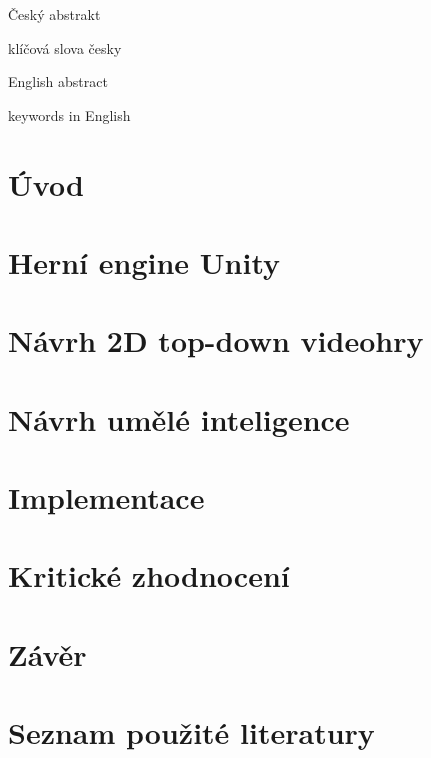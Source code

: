\documentclass[FM,Proj]{tulthesis}
\begin{document}
	
	\begin{abstractCZ}
		Český abstrakt
	\end{abstractCZ}
	
	\begin{keywordsCZ}
		klíčová slova česky
	\end{keywordsCZ}
	\vspace{2cm}
	
	\begin{abstractEN}
		English abstract
	\end{abstractEN}
	
	\begin{keywordsEN}
		keywords in English
	\end{keywordsEN}
	
	\tableofcontents
	
	\listoffigures
	
	\listoftables
	
	\clearpage
	
	
	\chapter{Úvod}
	
	\chapter{Herní engine Unity}
	
	\chapter{Návrh 2D top-down videohry}
	
	\chapter{Návrh umělé inteligence}
	
	\chapter{Implementace}
	
	\chapter{Kritické zhodnocení}
	
	\chapter{Závěr}
	
	\chapter*{Seznam použité literatury}
	\printbibliography[heading=none]
	
\end{document}

